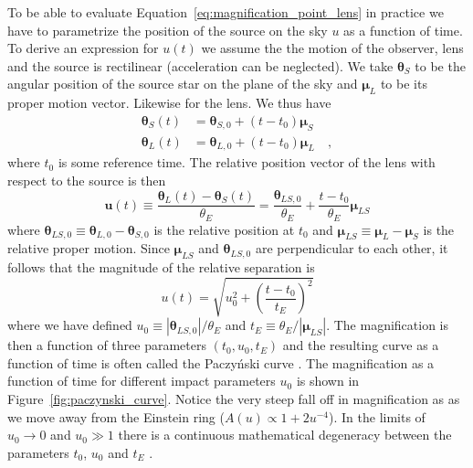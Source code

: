 \documentclass[12pt]{report}
\begin{document}
To be able to evaluate Equation~\ref{eq:magnification_point_lens} in practice
we have to parametrize the position of the source on the sky $u$ as a function
of time. To derive an expression for $u(t)$ we assume the the motion of the
observer, lens and the source is rectilinear (acceleration can be neglected).
We take $\boldsymbol{\theta}_S$ to be the angular position of the source star
on the plane of the sky and $\boldsymbol{\mu}_L$ to be its proper motion
vector. Likewise for the lens. We thus have
\begin{align}
    \boldsymbol{\theta}_S(t) & =\boldsymbol{\theta}_{S, 0}+
    \left(t-t_{0}\right) \boldsymbol{\mu}_S
    \label{eq:source_position}                              \\
    \boldsymbol{\theta}_L(t) & =\boldsymbol{\theta}_{L, 0}
    +\left(t-t_{0}\right) \boldsymbol{\mu}_L\quad,
    \label{eq:lens_position}
\end{align}
where $t_0$ is some reference time.
The relative position vector of the lens with respect to the source is then
\begin{equation}
    \boldsymbol{u}(t) \equiv \frac{\boldsymbol{\theta}_L(t)
        -\boldsymbol{\theta}_S(t)}{\theta_E}=
    \frac{\boldsymbol{\theta}_{LS, 0}}{\theta_E}
    +\frac{t-t_{0}}{\theta_E} \boldsymbol{\mu}_{LS}
    \label{eq:relative_trajectory_no_parallax}
\end{equation}
where
$\boldsymbol{\theta}_{L S, 0}\equiv\boldsymbol{\theta}_{L,0}-\boldsymbol{\theta}_{S, 0}$
is the relative position at $t_0$ and
$\boldsymbol{\mu}_{LS}\equiv \boldsymbol{\mu}_{L}- \boldsymbol{\mu}_{S}$ is the
relative proper motion.
Since $\boldsymbol{\mu}_{LS}$ and $\boldsymbol{\theta}_{L S, 0}$ are
perpendicular to each other, it follows that the magnitude of the relative
separation is
\begin{equation}
    u(t)=\sqrt{u_0^2+ \left(\frac{t-t_0}{t_E}\right)^2}
\end{equation}
where we have defined $u_0\equiv |\boldsymbol{\theta}_{L S, 0}|/\theta_E$
and $t_E\equiv \theta_E/|\boldsymbol{\mu}_{LS}|$.
The magnification is then a function of three parameters $(t_0, u_0, t_E)$
and the resulting curve as a function of time is often called the Paczy\'nski curve
\citep{1986ApJ...304....1P,1986ApJ...301..503P}.
The magnification as a function of time for different impact parameters $u_0$
is shown in Figure~\ref{fig:paczynski_curve}. Notice the very steep fall off in
magnification as as we move away from the Einstein ring ($A(u)\propto
    1+2u^{-4}$).
In the limits of $u_0\rightarrow 0$ and $u_0\gg 1$  there is a continuous
mathematical degeneracy between the parameters $t_0$, $u_0$ and $t_E$
\citep{1997ApJ...487...55W}.
\end{document}
